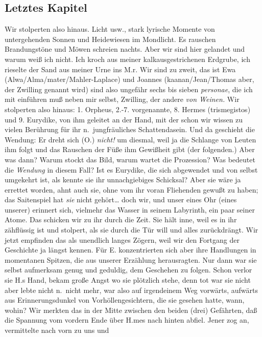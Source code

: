 \documentclass[
]{article}
\author{}
\date{\vspace{-2.5em}}
\begin{document}
\subsection{Letztes Kapitel}\label{letztes-kapitel}

Wir stolperten also hinaus. Licht usw., stark lyrische Momente von
untergehenden Sonnen und Heidewiesen im Mondlicht. Es rauschen
Brandungstöne und Möwen schreien nachts. Aber wir sind hier gelandet und
warum weiß ich nicht. Ich kroch aus meiner kalkausgestrichenen Erdgrube,
ich rieselte der Sand aus meiner Urne ins M.r. Wir sind zu zweit, das
ist Ewa (Alwa/Alma/mater/Mahler-Laplace) und Joannes (kaanan/Jean/Thomas
aber, der Zwilling genannt wird) sind also ungefähr sechs bis sieben
\emph{personae}, die ich mit einführen muß neben mir selbst, Zwilling,
der andere \emph{von Weinen. }Wir stolperten also hinaus: 1. Orpheus,
2.-7. vorgenannte, 8. Hermes (trismegistos) und 9. Eurydike, von ihm
geleitet an der Hand, mit der schon wir wissen zu vielen Berührung für
ihr n.~jungfräuliches Schattendasein. Und da geschieht die Wendung: Er
dreht sich (O.) \emph{nicht!} um diesmal, weil ja die Schlange von
Leuten ihm folgt und das Rauschen der Füße ihm Gewißheit gibt (der
folgenden.) Aber was dann? Warum stockt das Bild, warum wartet die
Prozession? Was bedeutet die \emph{Wendung} in diesem Fall? Ist es
Eurydike, die sich abgewendet und von selbst umgekehrt ist, als kennte
sie ihr unnachgiebiges Schicksal? Aber sie wäre ja errettet worden, ahnt
auch sie, ohne vom ihr voran Fliehenden gewußt zu haben; das Saitenspiel
hat \emph{sie} nicht gehört\ldots{} doch wir, und unser eines Ohr (eines
unserer) erinnert sich, vielmehr das Wasser in seinem Labyrinth, ein
paar seiner Atome. Das schicken wir zu ihr durch die Zeit. Sie hält
inne, weil es in ihr zähflüssig ist und stolpert, als sie durch die Tür
will und alles zurückdrängt. Wir jetzt empfinden das als unendlich
langes Zögern, weil wir den Fortgang der Geschichte ja längst kennen.
Für E. konzentrierten sich aber ihre Handlungen in momentanen Spitzen,
die aus unserer Erzählung herausragten. Nur dann war sie selbst
aufmerksam genug und geduldig, dem Geschehen zu folgen. Schon verlor sie
H.s Hand, bekam große Angst wo sie plötzlich stehe, denn tot war sie
nicht aber lebte nicht n.~nicht mehr, war also auf irgendeinem Weg
vorwärts, aufwärts aus Erinnerungsdunkel von Vorhöllengesichtern, die
sie gesehen hatte, wann, wohin? Wir merkten das in der Mitte zwischen
den beiden (drei) Gefährten, daß die Spannung vom vordern Ende über
H.mes nach hinten abfiel. Jener zog an, vermittelte nach vorn zu uns und
\end{document}
